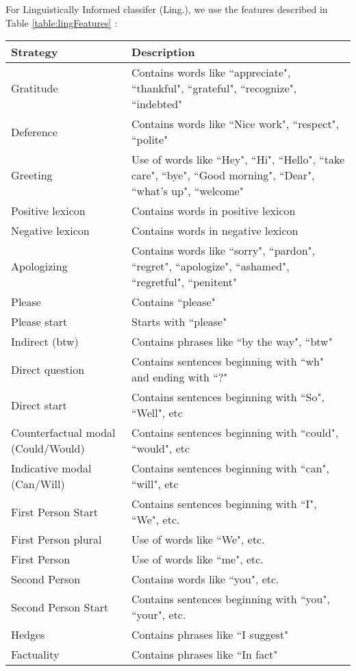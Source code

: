 \documentclass[conference]{IEEEtran}
\begin{document}
For Linguistically Informed classifer (Ling.), we use the features described in Table \ref{table:lingFeatures} \cite{Jurafsky}:
\begin{table*}[htbp]
\caption{Politeness Strategies used for features in Linguistically Informed Classifiers }
\centering
\vspace{5pt}
\begin{tabular}{|l|l|}
\hline
Strategy & Description \\
\hline\hline
Gratitude & Contains words like ``appreciate", ``thankful", ``grateful", ``recognize", ``indebted" \\
\hline
Deference & Contains words like ``Nice work", ``respect", ``polite" \\
\hline
Greeting & Use of words like ``Hey", ``Hi", ``Hello", ``take care", ``bye", ``Good morning", ``Dear", ``what's up", ``welcome" \\
\hline
Positive lexicon & Contains words in positive lexicon \\
\hline
Negative lexicon & Contains words in negative lexicon \\
\hline
Apologizing & Contains words like ``sorry", ``pardon", ``regret", ``apologize", ``ashamed", ``regretful", ``penitent" \\
\hline
Please & Contains ``please"\\
\hline
Please start & Starts with ``please"\\
\hline
Indirect (btw) & Contains phrases like ``by the way", ``btw" \\
\hline
Direct question  & Contains sentences beginning with ``wh" and ending with ``?" \\
\hline
Direct start & Contains sentences beginning with ``So", ``Well", etc \\
\hline
Counterfactual modal (Could/Would) & Contains sentences beginning with ``could", ``would", etc \\
\hline
Indicative modal (Can/Will) & Contains sentences beginning with ``can", ``will", etc \\
\hline
First Person Start & Contains sentences beginning with ``I", ``We", etc. \\
\hline
First Person plural & Use of words like ``We", etc. \\
\hline
First Person & Use of words like ``me", etc. \\
\hline
Second Person & Contains words like ``you", etc. \\
\hline
Second Person Start & Contains sentences beginning with ``you", ``your", etc. \\
\hline
Hedges & Contains phrases like ``I suggest" \\
\hline
Factuality & Contains phrases like ``In fact" \\
\hline
\hline
\end{tabular}
\label{table:lingFeatures}
\end{table*}
\end{document}
